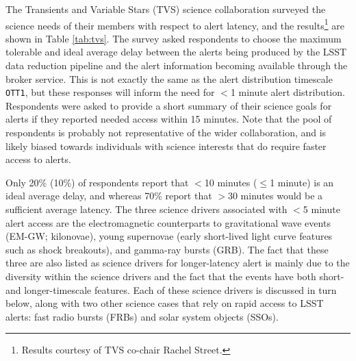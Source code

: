 \documentclass[DM,lsstdraft,authoryear,toc]{lsstdoc}
\begin{document}
The Transients and Variable Stars (TVS) science collaboration surveyed the science needs of their members with respect to alert latency, and the results\footnote{Results courtesy of TVS co-chair Rachel Street.} are shown in Table \ref{tab:tvs}. The survey asked respondents to choose the maximum tolerable and ideal average delay between the alerts being produced by the LSST data reduction pipeline and the alert information becoming available through the broker service. This is not exactly the same as the alert distribution timescale {\tt OTT1}, but these responses will inform the need for $<$1 minute alert distribution.  Respondents were asked to provide a short summary of their science goals for alerts if they reported needed access within 15 minutes. Note that the pool of respondents is probably not representative of the wider collaboration, and is likely biased towards individuals with science interests that do require faster access to alerts. 

Only 20\% (10\%) of respondents report that $<$10 minutes ($\leq$1 minute) is an ideal average delay, and whereas 70\% report that $>$30 minutes would be a sufficient average latency. The three science drivers associated with $<$5 minute alert access are the electromagnetic counterparts to gravitational wave events (EM-GW; kilonovae), young supernovae (early short-lived light curve features such as shock breakouts), and gamma-ray bursts (GRB). The fact that these three are also listed as science drivers for longer-latency alert is mainly due to the diversity within the science drivers and the fact that the events have both short- and longer-timescale features. Each of these science drivers is discussed in turn below, along with two other science cases that rely on rapid access to LSST alerts: fast radio bursts (FRBs) and solar system objects (SSOs).
\end{document}
